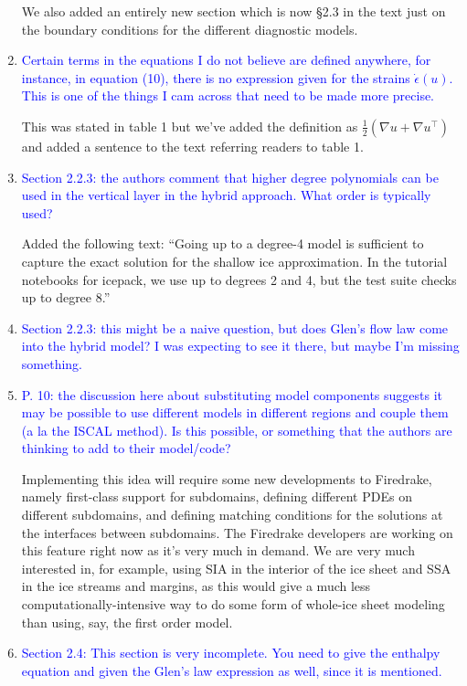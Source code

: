 \documentclass{article}
\theoremstyle{definition}
\theoremstyle{plain}
\begin{document}
\begin{enumerate}
We also added an entirely new section which is now \S2.3 in the text just on the boundary conditions for the different diagnostic models.

\item \textcolor{blue}{Certain terms in the equations I do not believe are defined anywhere, for instance, in equation (10),
there is no expression given for the strains $\dot\epsilon(u)$.
This is one of the things I cam across that need to
be made more precise.}

This was stated in table 1 but we've added the definition as $\frac{1}{2}(\nabla u + \nabla u^\top)$ and added a sentence to the text referring readers to table 1.
\item \textcolor{blue}{Section 2.2.3: the authors comment that higher degree polynomials can be used in the vertical layer
in the hybrid approach. What order is typically used?}

Added the following text: ``Going up to a degree-4 model is sufficient to capture the exact solution for the shallow ice approximation.
In the tutorial notebooks for icepack, we use up to degrees 2 and 4, but the test suite checks up to degree 8.''
\item \textcolor{blue}{Section 2.2.3: this might be a naive question, but does Glen's flow law come into the hybrid model?
I was expecting to see it there, but maybe I'm missing something.}
\item \textcolor{blue}{P. 10: the discussion here about substituting model components suggests it may be possible to use
different models in different regions and couple them (a la the ISCAL method). Is this possible, or
something that the authors are thinking to add to their model/code?}

Implementing this idea will require some new developments to Firedrake, namely first-class support for subdomains, defining different PDEs on different subdomains, and defining matching conditions for the solutions at the interfaces between subdomains.
The Firedrake developers are working on this feature right now as it's very much in demand.
We are very much interested in, for example, using SIA in the interior of the ice sheet and SSA in the ice streams and margins, as this would give a much less computationally-intensive way to do some form of whole-ice sheet modeling than using, say, the first order model.
\item \textcolor{blue}{Section 2.4: This section is very incomplete. You need to give the enthalpy equation and given the
Glen's law expression as well, since it is mentioned.}


\end{enumerate}
\end{document}
